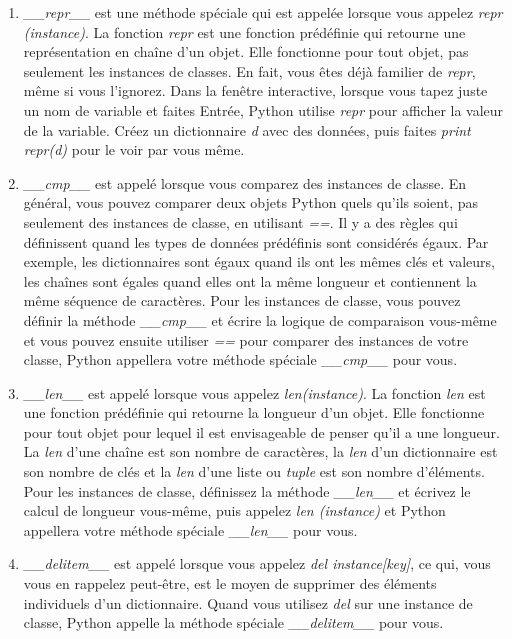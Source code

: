 \begin{enumerate}
    \item \emph{\_\_repr\_\_} est une méthode spéciale qui est appelée lorsque vous appelez \emph{repr (instance)}. La fonction \emph{repr} est une fonction prédéfinie qui retourne une représentation en chaîne d'un objet. Elle fonctionne pour tout objet, pas seulement les instances de classes. En fait, vous êtes déjà familier de \emph{repr}, même si vous l'ignorez. Dans la fenêtre interactive, lorsque vous tapez juste un nom de variable et faites Entrée, Python utilise \emph{repr} pour afficher la valeur de la variable. Créez un dictionnaire \emph{d} avec des données, puis faites \emph{print repr(d)} pour le voir par vous même.
    \item\emph{\_\_cmp\_\_} est appelé lorsque vous comparez des instances de classe. En général, vous pouvez comparer deux objets Python quels qu'ils soient, pas seulement des instances de classe, en utilisant \emph{==}. Il y a des règles qui définissent quand les types de données prédéfinis sont considérés égaux. Par exemple, les dictionnaires sont égaux quand ils ont les mêmes clés et valeurs, les chaînes sont égales quand elles ont la même longueur et contiennent la même séquence de caractères. Pour les instances de classe, vous pouvez définir la méthode \emph{\_\_cmp\_\_} et écrire la logique de comparaison vous-même et vous pouvez ensuite utiliser \emph{==} pour comparer des instances de votre classe, Python appellera votre méthode spéciale \emph{\_\_cmp\_\_} pour vous.
    \item \emph{\_\_len\_\_} est appelé lorsque vous appelez \emph{len(instance)}. La fonction \emph{len} est une fonction prédéfinie qui retourne la longueur d'un objet. Elle fonctionne pour tout objet pour lequel il est envisageable de penser qu'il a une longueur. La \emph{len} d'une chaîne est son nombre de caractères, la \emph{len} d'un dictionnaire est son nombre de clés et la \emph{len} d'une liste ou \emph{tuple} est son nombre d'éléments. Pour les instances de classe, définissez la méthode \emph{\_\_len\_\_} et écrivez le calcul de longueur vous-même, puis appelez \emph{len (instance)} et Python appellera votre méthode spéciale \emph{\_\_len\_\_} pour vous.
    \item \emph{\_\_delitem\_\_} est appelé lorsque vous appelez \emph{del instance[key]}, ce qui, vous vous en rappelez peut-être, est le moyen de supprimer des éléments individuels d'un dictionnaire. Quand vous utilisez \emph{del} sur une instance de classe, Python appelle la méthode spéciale \emph{\_\_delitem\_\_} pour vous.
\end{enumerate}


